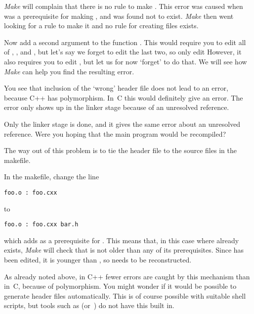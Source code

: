   {\emph{Make} will complain that there is no rule to make
    . This error was caused when  was a
    prerequisite for making , and was found not to exist. 
    \emph{Make} then went
    looking for a rule to make it and no rule for creating 
    files exists.}{}

Now add a second argument to the function .
This would require you to edit all of , ,
and , 
but let's say we forget to edit the last two, so only edit 
However, it also requires you to edit , but let us for
now `forget' to do that. We will see how \emph{Make} can help you find
the resulting error.

          {You see that inclusion of the `wrong' header file
            does not lead to an error, because C++ has polymorphism.
            In~C this would definitely give an error.
            The error only shows up in the linker stage
            because of an unresolved reference.}{}

    {Only the linker stage is done, and it gives the same error about
      an unresolved reference. Were you hoping that the main program
    would be recompiled?}

The way out of this problem is to tie the header file to the source files
in the makefile.

In the makefile, change the line
\begin{verbatim}
foo.o : foo.cxx
\end{verbatim}
to
\begin{verbatim}
foo.o : foo.cxx bar.h
\end{verbatim}
which adds  as a prerequisite for . This means that,
in this case where  already exists, \emph{Make} will check
that  is not older than any of its prerequisites. Since
 has been edited, it is younger than , so 
needs to be reconstructed.

\begin{remark}
  As already noted above, in C++ fewer errors are caught by this
  mechanism than in~C, because of polymorphism.
  You might wonder if it would be possible to generate header files
  automatically. This is of course possible with suitable shell scripts,
  but tools such as  (or~) do not have this built in.
\end{remark}

